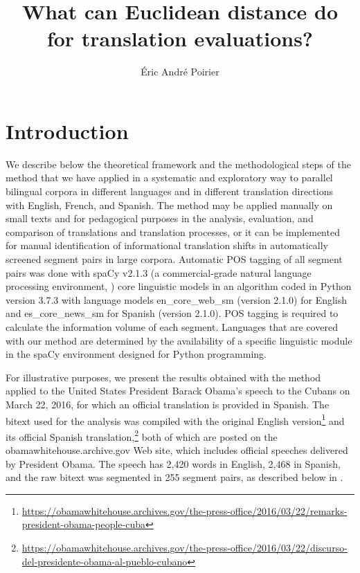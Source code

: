 \documentclass[output=paper]{langsci/langscibook}
\author{Éric André Poirier\affiliation{Université du Québec à Trois-Rivières}}
\title{What can Euclidean distance do for translation evaluations?}
\begin{document}
\maketitle

\section{Introduction}

We describe below the theoretical framework and the methodological steps of the method that we have applied in a systematic and exploratory way to parallel bilingual corpora in different languages and in different translation directions with English, French, and Spanish. The method may be applied manually on small texts and for pedagogical purposes in the analysis, evaluation, and comparison of translations and translation processes, or it can be implemented for manual identification of informational translation shifts in automatically screened segment pairs in large corpora. Automatic POS tagging of all segment pairs was done with spaCy v2.1.3 (a commercial-grade natural language processing environment, \parencite{spacy16}) core linguistic models in an algorithm coded in Python version 3.7.3 with language models en\_core\_web\_sm (version 2.1.0) for English and es\_core\_news\_sm for Spanish (version 2.1.0). POS tagging is required to calculate the information volume of each segment. Languages that are covered with our method are determined by the availability of a specific linguistic module in the spaCy environment designed for Python programming.

For illustrative purposes, we present the results obtained with the method applied to the United States President Barack Obama’s speech to the Cubans on March 22, 2016, for which an official translation is provided in Spanish. The bitext used for the analysis was compiled with the original English version\footnote{\href{https://obamawhitehouse.archives.gov/the-press-office/2016/03/22/remarks-president-obama-people-cuba}{https://obamawhitehouse.archives.gov/the-press-office/2016/03/22/remarks-president-obama-people-cuba}} and its official Spanish translation,\footnote{\href{https://obamawhitehouse.archives.gov/the-press-office/2016/03/22/discurso-del-presidente-obama-al-pueblo-cubano}{https://obamawhitehouse.archives.gov/the-press-office/2016/03/22/discurso-del-presidente-obama-al-pueblo-cubano}} both of which are posted on the obamawhitehouse.archive.gov Web site, which includes official speeches delivered by President Obama. The speech has 2,420 words in English, 2,468 in Spanish, and the raw bitext was segmented in 255 segment pairs, as described below in .
\end{document}
